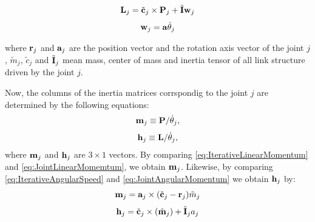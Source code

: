 \begin{equation}
\begin{aligned}
{\bf L}_j &= \tilde{\bf c}_j \times {\bf P}_j + \tilde{\bf I}{\bf w}_j \\
\end{aligned}
\label{eq:IterativeAngularMomentum}
\end{equation}
\begin{equation}
\begin{aligned}
{\bf w}_j &= {\bf a}\dot{\theta}_j \\
\end{aligned}
\label{eq:IterativeAngularSpeed}
\end{equation}

where ${\bf r}_j$ and ${\bf a}_j$ are the position vector and the rotation axis vector
of the joint $j$, $\tilde{m}_j$, $\tilde{c}_j$ and $\tilde{\bf I}_j$ mean mass,
center of mass and inertia tensor of all link structure driven by the joint $j$.
\par
Now, the columns of the inertia matrices corrspondig to the joint $j$ are determined
by the following equations:
\begin{equation}
\begin{aligned}
{\bf m}_j & \equiv {\bf P}/\dot{\theta}_j, \\
\end{aligned}
\label{eq:JointLinearMomemtum}
\end{equation}
\begin{equation}
\begin{aligned}
{\bf h}_j & \equiv {\bf L}/\dot{\theta}_j, \\
\end{aligned}
\label{eq:JointAngularMomentum}
\end{equation}
where ${\bf m}_j$  and ${\bf h}_j$ are $3 \times 1$ vectors. By comparing
\ref{eq:IterativeLinearMomentum} and \ref{eq:JointLinearMomemtum}, we obtain
${\bf m}_j$. Likewise, by comparing \ref{eq:IterativeAngularSpeed}
and \ref{eq:JointAngularMomentum} we obtain ${\bf h}_j$ by:
\begin{equation}
{\bf m}_j = {\bf a}_j \times ( \tilde{\bf c}_j - {\bf r}_j) \tilde{m}_j
\label{eq:IterativeLinearMomentum2}
\end{equation}
\begin{equation}
{\bf h}_j = \tilde{\bf c}_j \times ( \tilde{\bf m}_j ) + \tilde{\bf I}_j a_j
\label{eq:IterativeLinearMomentum2}
\end{equation}


